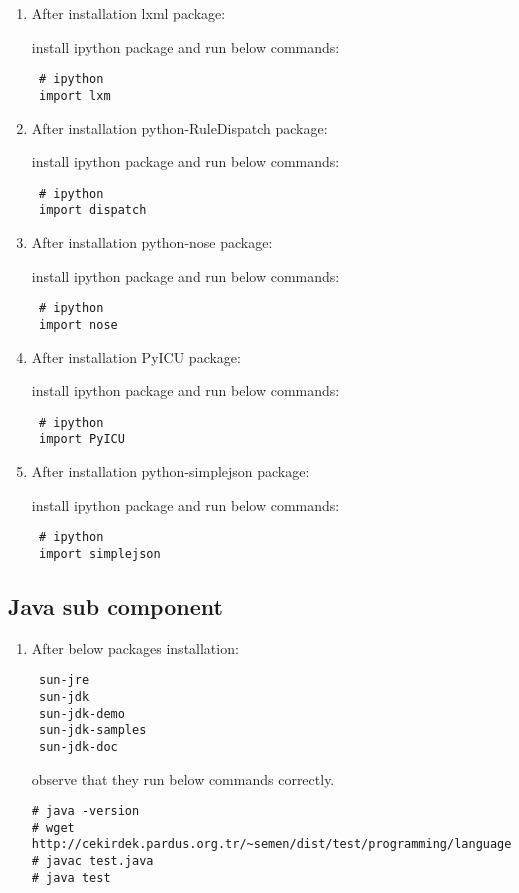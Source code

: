 \documentclass[a4paper,10pt]{article}
\begin{document}
\begin{enumerate}
\item After installation lxml package:  

install ipython package and run below commands:
\begin{verbatim}
 # ipython
 import lxm
\end{verbatim}
\item After installation python-RuleDispatch package:  

install ipython package and run below commands:
\begin{verbatim}
 # ipython
 import dispatch
\end{verbatim}

\item After installation python-nose package:  

install ipython package and run below commands:
\begin{verbatim}
 # ipython
 import nose
\end{verbatim}

\item After installation PyICU package:  

install ipython package and run below commands:
\begin{verbatim}
 # ipython
 import PyICU
\end{verbatim}

\item After installation python-simplejson package:  

install ipython package and run below commands:
\begin{verbatim}
 # ipython
 import simplejson
\end{verbatim}

\end{enumerate}

\subsection{Java sub component}
\begin{enumerate}
 \item After below packages installation:
\begin{verbatim}
 sun-jre
 sun-jdk
 sun-jdk-demo
 sun-jdk-samples
 sun-jdk-doc
\end{verbatim}

observe that they run below commands correctly.

\begin{verbatim}
# java -version
# wget http://cekirdek.pardus.org.tr/~semen/dist/test/programming/language/java/test.java
# javac test.java
# java test
\end{verbatim}
\end{enumerate}
\end{document}
